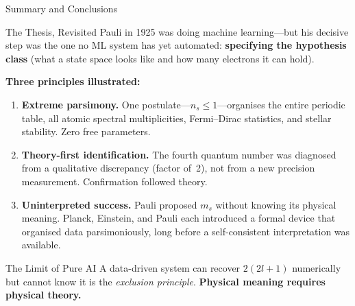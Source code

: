\documentclass[aspectratio=169,12pt]{beamer}
\begin{document}
\begin{frame}[shrink=35]{Summary and Conclusions}

\begin{block}{The Thesis, Revisited}
Pauli in 1925 was doing machine learning---but his decisive step was the
one no ML system has yet automated: \textbf{specifying the hypothesis
class} (what a state space looks like and how many electrons it can hold).
\end{block}

\bigskip
\textbf{Three principles illustrated:}
\begin{enumerate}
  \item \textbf{Extreme parsimony.}  One postulate---$n_s\leq 1$---organises
    the entire periodic table, all atomic spectral multiplicities, Fermi--Dirac
    statistics, and stellar stability.  Zero free parameters.
  \item \textbf{Theory-first identification.}  The fourth quantum number was
    diagnosed from a qualitative discrepancy (factor of~2), not from a new
    precision measurement.  Confirmation followed theory.
  \item \textbf{Uninterpreted success.}  Pauli proposed $m_s$ without knowing
    its physical meaning.  Planck, Einstein, and Pauli each introduced a
    formal device that organised data parsimoniously, long before a
    self-consistent interpretation was available.
\end{enumerate}

\bigskip
\begin{alertblock}{The Limit of Pure AI}
A data-driven system can recover $2(2l+1)$ numerically but cannot know it
is the \emph{exclusion principle}.
\textbf{Physical meaning requires physical theory.}
\end{alertblock}

\end{frame}
\end{document}
